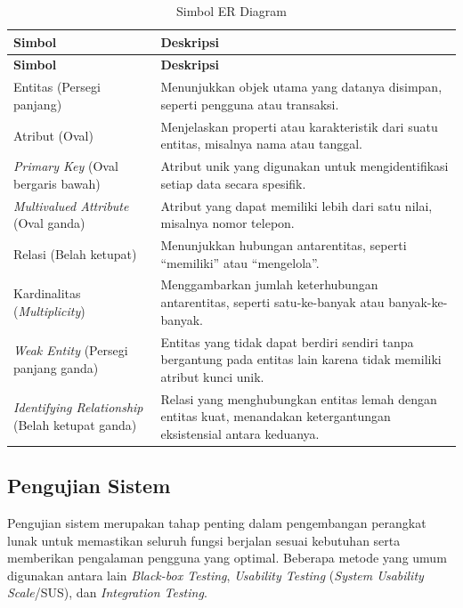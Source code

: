 \begin{longtable}{|p{}|p{}|}
	\caption{Simbol ER Diagram}
	\label{table:2.simbolERD}\\
	\hline
	\textbf{Simbol} & \textbf{Deskripsi} \\
	\hline
	\endfirsthead
	\hline
	\textbf{Simbol} & \textbf{Deskripsi} \\
	\hline
	\endhead
	Entitas (Persegi panjang) & Menunjukkan objek utama yang datanya disimpan, seperti pengguna atau transaksi. \\
	\hline
	Atribut (Oval) & Menjelaskan properti atau karakteristik dari suatu entitas, misalnya nama atau tanggal. \\
	\hline
	\textit{Primary Key} (Oval bergaris bawah) & Atribut unik yang digunakan untuk mengidentifikasi setiap data secara spesifik. \\
	\hline
	\textit{Multivalued Attribute} (Oval ganda) & Atribut yang dapat memiliki lebih dari satu nilai, misalnya nomor telepon. \\
	\hline
	Relasi (Belah ketupat) & Menunjukkan hubungan antarentitas, seperti ``memiliki'' atau ``mengelola''. \\
	\hline
	Kardinalitas (\textit{Multiplicity}) & Menggambarkan jumlah keterhubungan antarentitas, seperti satu-ke-banyak atau banyak-ke-banyak. \\
	\hline
	\textit{Weak Entity} (Persegi panjang ganda) & Entitas yang tidak dapat berdiri sendiri tanpa bergantung pada entitas lain karena tidak memiliki atribut kunci unik. \\
	\hline
	\textit{Identifying Relationship} (Belah ketupat ganda) & Relasi yang menghubungkan entitas lemah dengan entitas kuat, menandakan ketergantungan eksistensial antara keduanya. \\
	\hline
\end{longtable}

\subsection{Pengujian Sistem} \label{II.PengujianSistem}
Pengujian sistem merupakan tahap penting dalam pengembangan perangkat lunak untuk memastikan seluruh fungsi berjalan sesuai kebutuhan serta memberikan pengalaman pengguna yang optimal. Beberapa metode yang umum digunakan antara lain \textit{Black-box Testing}, \textit{Usability Testing} (\textit{System Usability Scale}/SUS), dan \textit{Integration Testing}.\par

